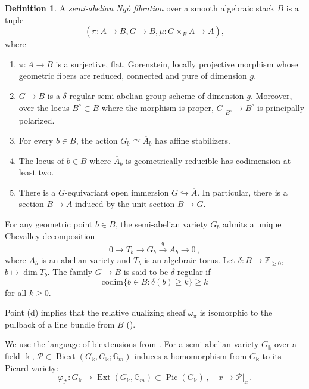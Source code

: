 \documentclass[11pt]{article}
\def\ZZ{\mathbb{Z}}
\def\codim{\mathrm{codim}}
\newcommand{\barA}{\overline{A}}
\newcommand{\Pic}{\operatorname{Pic}}
\theoremstyle{definition}
\newtheorem{definition}{Definition}[section]
\begin{document}
\begin{definition}\label{def:sa}
    A {\em semi-abelian Ng\^o fibration} over a smooth algebraic stack $B$ is a tuple
    \[
    (\pi : \barA \to B, G\to B, \mu : G\times_B \barA \to \barA),
    \]
	where
    \begin{enumerate}[label=(\alph*)]
        \item $\pi :\barA \to B$ is a surjective, flat, Gorenstein, locally projective morphism whose geometric fibers are reduced, connected and pure of dimension $g$.
        \item $G \to B$ is a $\delta$-regular semi-abelian group scheme of dimension $g$. Moreover, over the locus $B^\circ \subset B$ where the morphism is proper, $G|_{B^\circ} \to B^\circ$ is principally polarized.
        \item For every $b\in B$, the action $G_b \curvearrowright \barA_b$ has affine stabilizers.
        \item The locus of $b \in B$ where $\barA_b$ is geometrically reducible has codimension at least two.
		\item There is a $G$-equivariant open immersion $G\hookrightarrow \barA$. In particular, there is a section $B\to \barA$ induced by the unit section $B\to G$.
    \end{enumerate}
\end{definition}

For any geometric point $b \in B$, the semi-abelian variety $G_b$ admits a unique Chevalley decomposition
\begin{equation}\label{eq:Chev}
	0 \to T_b \to G_b \stackrel{q}{\to} A_b \to 0\,,
\end{equation}
where $A_b$ is an abelian variety and $T_b$ is an algebraic torus. Let $\delta : B \to \ZZ_{\ge 0}$, $b \mapsto \dim T_b$. The family $G\to B$
is said to be $\delta$-regular if
\[
\codim \{ b \in B : \delta(b) \ge k\} \geq k
\]
for all $k \ge 0$.

Point (d) implies that the relative dualizing sheaf $\omega_\pi$ is isomorphic to the pullback of a line bundle from $B$ (\cite[Remark 2.2]{AF}).

We use the language of biextensions from \cite{Mum_ext,Hodge3}. For a semi-abelian variety $G_{\Bbbk}$ over a field $\Bbbk$, $\mathcal P \in \operatorname{Biext}(G_{\Bbbk}, G_{\Bbbk};\mathbb G_{m})$ induces a homomorphism from $G_{\Bbbk}$ to its Picard variety:
$$
\varphi_{\mathcal P} : G_{\Bbbk} \to \operatorname{Ext}(G_{\Bbbk}, \mathbb G_{m}) \subset \Pic(G_{\Bbbk})\,, \quad x \mapsto \mathcal P|_x\,.
$$
\end{document}
